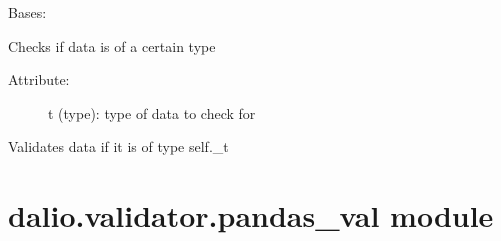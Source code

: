 \documentclass[letterpaper,10pt,english]{sphinxmanual}
\begin{document}
\begin{fulllineitems}
\label{\detokenize{dalio.validator:dalio.validator.base_val.IS_TYPE}}
Bases: {\hyperref[\detokenize{dalio.validator:dalio.validator.validator.Validator}]{}}

Checks if data is of a certain type
\begin{description}
\item[{Attribute:}] \leavevmode
t (type): type of data to check for

\end{description}

\begin{fulllineitems}
\label{\detokenize{dalio.validator:dalio.validator.base_val.IS_TYPE.validate}}
Validates data if it is of type self.\_t

\end{fulllineitems}


\end{fulllineitems}



\section{dalio.validator.pandas\_val module}
\label{\detokenize{dalio.validator:module-dalio.validator.pandas_val}}\label{\detokenize{dalio.validator:dalio-validator-pandas-val-module}}
\end{document}
